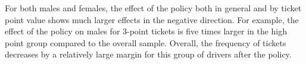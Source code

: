 


For both males and females, 
the effect of the policy both in general and by ticket point value 
shows much larger effects in the negative direction. 
For example, the effect of the policy on males for 3-point tickets is five times larger 
in the high point group compared to the overall sample. 
Overall, the frequency of tickets decreases by a relatively large margin 
for this group of drivers after the policy.




